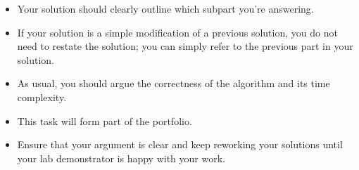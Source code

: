 \documentclass{article}
\begin{document}
\begin{rubric}
\begin{itemize}
    \item Your solution should clearly outline which subpart you're answering.

    \item If your solution is a simple modification of a previous solution, you do not need to restate the solution; you can simply refer to the previous part in your solution.

    \item As usual, you should argue the correctness of the algorithm and its time complexity.

    \item This task will form part of the portfolio.
    \item Ensure that your argument is clear and keep reworking your solutions until your lab demonstrator is happy with your work.
\end{itemize}
\end{rubric}
\end{document}
